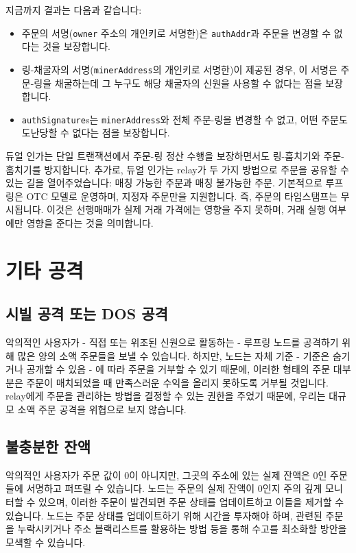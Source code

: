 \documentclass[UTF8,nofonts]{article}
\begin{document}
\begin{multicols}{2}
\begin{enumerate}
\end{enumerate}

지금까지 결과는 다음과 같습니다:

\begin{itemize}

	\item  주문의 서명(\verb|owner| 주소의 개인키로 서명한)은 \verb|authAddr|과 주문을 변경할 수 없다는 것을 보장합니다.
	\item  링-채굴자의 서명(\verb|minerAddress|의 개인키로 서명한)이 제공된 경우, 이 서명은 주문-링을 채굴하는데 그 누구도 해당 채굴자의 신원을 사용할 수 없다는 점을 보장합니다. 
	\item  \verb|authSignature|s는 \verb|minerAddress|와 전체 주문-링을 변경할 수 없고, 어떤 주문도 도난당할 수 없다는 점을 보장합니다. 

\end{itemize}

듀얼 인가는 단일 트랜잭션에서 주문-링 정산 수행을 보장하면서도 링-훔치기와 주문-훔치기를 방지합니다. 추가로, 듀얼 인가는 relay가 두 가지 방법으로 주문을 공유할 수 있는 길을 열어주었습니다: 매칭 가능한 주문과 매칭 불가능한 주문. 기본적으로 루프링은 OTC 모델로 운영하며, 지정자 주문만을 지원합니다. 즉, 주문의 타임스탬프는 무시됩니다. 이것은 선행매매가 실제 거래 가격에는 영향을 주지 못하며, 거래 실행 여부에만 영향을 준다는 것을 의미합니다.

\section{기타 공격}

\subsection{시빌 공격 또는 DOS 공격}
악의적인 사용자가 - 직접 또는 위조된 신원으로 활동하는 - 루프링 노드를 공격하기 위해 많은 양의 소액 주문들을 보낼 수 있습니다. 하지만, 노드는 자체 기준 - 기준은 숨기거나 공개할 수 있음 - 에 따라 주문을 거부할 수 있기 때문에, 이러한 형태의 주문 대부분은 주문이 매치되었을 때 만족스러운 수익을 올리지 못하도록 거부될 것입니다. relay에게 주문을 관리하는 방법을 결정할 수 있는 권한을 주었기 때문에, 우리는 대규모 소액 주문 공격을 위협으로 보지 않습니다.    

\subsection{불충분한 잔액}
악의적인 사용자가 주문 값이 0이 아니지만, 그곳의 주소에 있는 실제 잔액은 0인 주문들에 서명하고 퍼뜨릴 수 있습니다. 노드는 주문의 실제 잔액이 0인지 주의 깊게 모니터할 수 있으며, 이러한 주문이 발견되면 주문 상태를 업데이트하고 이들을 제거할 수 있습니다.
노드는 주문 상태를 업데이트하기 위해 시간을 투자해야 하며, 관련된 주문을 누락시키거나 주소 블랙리스트를 활용하는 방법 등을 통해 수고를 최소화할 방안을 모색할 수 있습니다.



\end{multicols}
\end{document}
